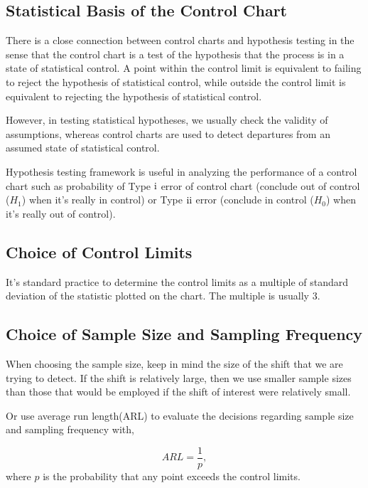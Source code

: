 \documentclass[12pt,oneside,a4paper]{article}
\numberwithin{equation}{section}
\newcommand{\RN}[1]{
	\textup{\uppercase\expandafter{\romannumeral#1}}
}
\begin{document}
\subsection{Statistical Basis of the Control Chart}

There is a close connection between control charts and hypothesis testing in the sense that the control chart is a test of the hypothesis that the process is in a state of statistical control. A point within the control limit is equivalent to failing to reject the hypothesis of statistical control, while outside the control limit is equivalent to rejecting the hypothesis of statistical control. 


However, in testing statistical hypotheses, we usually check the validity of assumptions, whereas control charts are used to detect departures from an assumed state of statistical control. 


Hypothesis testing framework is useful in analyzing the performance of a control chart such as probability of Type $\RN{1}$ error of control chart (conclude out of control ($H_1$) when it's really in control) or Type $\RN{2}$ error (conclude in control ($H_0$) when it's really out of control).


\subsection{Choice of Control Limits}
It's standard practice to determine the control limits as a multiple of standard deviation of the statistic plotted on the chart. The multiple is usually 3.  


\subsection{Choice of Sample Size and Sampling Frequency}

When choosing the sample size, keep in mind the size of the shift that we are trying to detect. If the shift is relatively large, then we use smaller sample sizes than those that would be employed if the shift of interest were relatively small.

Or use average run length(ARL) to evaluate the decisions regarding sample size and sampling frequency with, 

\begin{equation*}
ARL = \frac{1}{p},
\end{equation*}
where $p$ is the probability that any point exceeds the control limits. 
\end{document}
